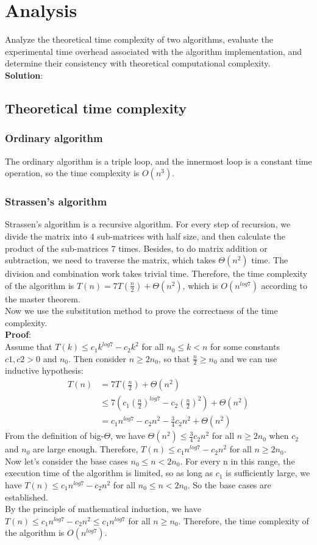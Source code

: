 \documentclass[UTF8]{ctexart}
\begin{document}
\section{Analysis}
Analyze the theoretical time complexity of two algorithms, evaluate the experimental time overhead associated with the algorithm implementation, and
determine their consistency with theoretical computational complexity.\\
\textbf{Solution}:
\subsection{Theoretical time complexity}
\subsubsection*{Ordinary algorithm}
The ordinary algorithm is a triple loop, and the innermost loop is a constant time operation, so the time complexity is $O(n^3)$.
\subsubsection*{Strassen's algorithm}
Strassen's algorithm is a recursive algorithm. For every step of recursion, we divide the matrix into $4$ sub-matrices with half size, 
and then calculate the product of the sub-matrices $7$ times. Besides, to do matrix addition or subtraction, we need to traverse the matrix, which takes $\Theta(n^2)$ time. 
The division and combination work takes trivial time.
Therefore, the time complexity of the algorithm is $T(n) = 7T(\frac{n}{2}) + \Theta(n^2)$, which is $O(n^{log7})$ according to the master theorem.\\
Now we use the substitution method to prove the correctness of the time complexity.\\
\textbf{Proof}:\\
Assume that $T(k) \leq c_1k^{log7} - c_2k^2$ for all $n_0 \leq k < n$ for some constants $c1, c2 > 0$ and $n_0$. Then consider $n \geq 2n_0$, so that $\frac{n}{2} \geq n_0$ and we can use inductive hypothesis: \\
\begin{align*}
    T(n) &= 7T(\frac{n}{2}) + \Theta(n^2) \\
    &\leq 7(c_1(\frac{n}{2})^{log7} - c_2(\frac{n}{2})^2) + \Theta(n^2) \\
    &= c_1n^{log7} - c_2n^2 - \frac{3}{4}c_2n^2 + \Theta(n^2)
\end{align*}
From the definition of big-$\Theta$, we have $\Theta(n^2) \leq \frac{3}{4}c_2n^2$ for all $n \geq 2n_0$ when $c_2$ and $n_0$ are large enough. Therefore, $T(n) \leq c_1n^{log7} - c_2n^2$ for all $n \geq 2n_0$.\\
Now let's consider the base cases $n_0 \leq n < 2n_0$. For every n in this range, the execution time of the algorithm is limited, so as long as $c_1$ is sufficiently large, we have $T(n) \leq c_1n^{log7} - c_2n^2$ for all $n_0 \leq n < 2n_0$. So the base cases are established.\\
By the principle of mathematical induction, we have $T(n) \leq c_1n^{log7} - c_2n^2 \leq c_1n^{log7}$ for all $n \geq n_0$. Therefore, the time complexity of the algorithm is $O(n^{log7})$.
\end{document}

